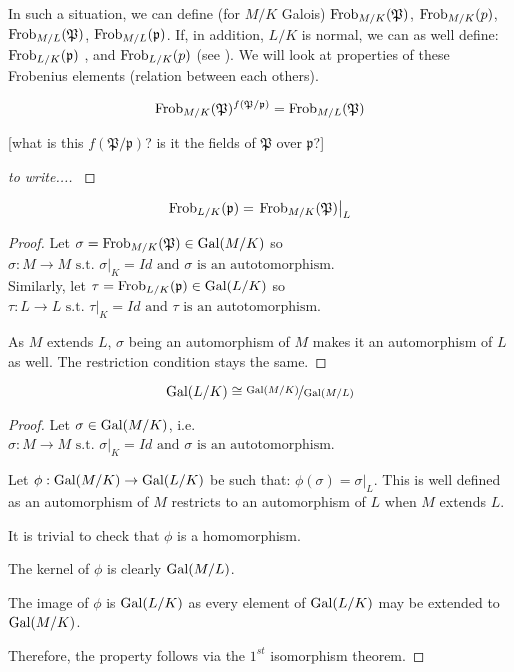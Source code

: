 In such a situation, we can define (for $M/K$ Galois)
$\text{Frob}_{M/K}(\mathfrak{P})$, 
$\text{Frob}_{M/K}(p)$, 
$\text{Frob}_{M/L}(\mathfrak{P})$, 
$\text{Frob}_{M/L}(\mathfrak{p})$.
If, in addition, $L/K$ is normal, we can as well define:
$\text{Frob}_{L/K}(\mathfrak{p})$ , and 
$\text{Frob}_{L/K}(p)$ (see \cite[p.99]{AlgebraicNumberFields}).
We will look at properties of these Frobenius elements (relation between each others).

\begin{property}
	$$
	\text{Frob}_{M/K}(\mathfrak{P})^{f(\mathfrak{P}/\mathfrak{p})} = \text{Frob}_{M/L}(\mathfrak{P})
	$$
	
	[what is this $f(\mathfrak{P}/\mathfrak{p})$? is it the fields of $\mathfrak{P}$ over $\mathfrak{p}$?]
\end{property}
\begin{proof}
[to write...]
\cite[p.99]{AlgebraicNumberFields}
\end{proof}

\begin{property}
	$$
	\text{Frob}_{L/K}(\mathfrak{p}) = \left. \text{Frob}_{M/K}(\mathfrak{P}) \right|_L
	$$
\end{property}
\begin{proof}
	Let $\sigma = \text{Frob}_{M/K}(\mathfrak{P}) \in \text{Gal}(M/K)$ so 
	$\sigma: M \to M \text{ s.t. } \left. \sigma \right|_K = Id \text{ and } \sigma \text{ is an autotomorphism}$.\\
	Similarly, let $\tau = \text{Frob}_{L/K}(\mathfrak{p}) \in \text{Gal}(L/K)$ so 
	$\tau: L \to L \text{ s.t. } \left. \tau \right|_K = Id \text{ and } \tau \text{ is an autotomorphism}$.
	
	As $M$ extends $L$, $\sigma$ being an automorphism of $M$ makes it an automorphism of $L$ as well.
	The restriction condition stays the same.
\end{proof}


\begin{property}
	$$
	\text{Gal}(L/K) \cong \nicefrac{\text{Gal}(M/K)}{\text{Gal}(M/L)}
	$$
\end{property}
\begin{proof}
	Let $\sigma \in \text{Gal}(M/K)$, i.e. $\sigma: M \to M \text{ s.t. } \left. \sigma \right|_K = Id \text{ and } \sigma \text{ is an autotomorphism}$.
	
	Let $\phi: \text{Gal}(M/K) \to \text{Gal}(L/K)$ be such that:
	$\phi(\sigma) = \left. \sigma \right|_L$.
	This is well defined as an automorphism of $M$ restricts to an automorphism of $L$ when $M$ extends $L$.
	
	It is trivial to check that $\phi$ is a homomorphism.
	
	The kernel of $\phi$ is clearly $\text{Gal}(M/L)$.
	
	The image of $\phi$ is $\text{Gal}(L/K)$ as every element of $\text{Gal}(L/K)$ may be extended to $\text{Gal}(M/K)$.
	
	Therefore, the property follows via the $1^{st}$ isomorphism theorem.
\end{proof}

